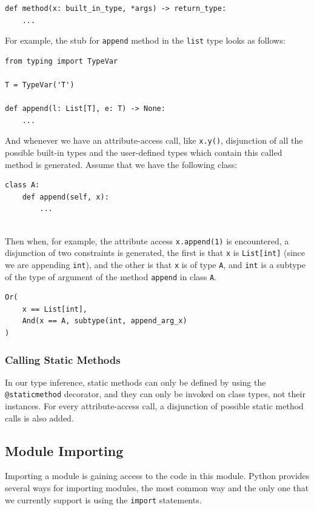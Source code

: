 \begin{lstlisting}
def method(x: built_in_type, *args) -> return_type:
	...
\end{lstlisting}
For example, the stub for \lstinline|append| method in the \lstinline|list| type looks as follows:

\begin{lstlisting}
from typing import TypeVar

T = TypeVar('T')

def append(l: List[T], e: T) -> None:
	...
\end{lstlisting}

And whenever we have an attribute-access call, like \lstinline|x.y()|, disjunction of all the possible built-in types and the user-defined types which contain this called method is generated. Assume that we have the following class:

\begin{lstlisting}
class A:
	def append(self, x):
		...
		
\end{lstlisting}

Then when, for example, the attribute access \lstinline|x.append(1)| is encountered, a disjunction of two constraints is generated, the first is that \lstinline|x| is \lstinline|List[int]| (since we are appending \lstinline|int|), and the other is that \lstinline|x| is of type \lstinline|A|, and \lstinline|int| is a subtype of the type of argument of the method \lstinline|append| in class \lstinline|A|.

\begin{lstlisting}
Or(
	x == List[int],
	And(x == A, subtype(int, append_arg_x)
)
\end{lstlisting}

\subsubsection{Calling Static Methods}
In our type inference, static methods can only be defined by using the \lstinline|@staticmethod| decorator, and they can only be invoked on class types, not their instances. For every attribute-access call, a disjunction of possible static method calls is also added.

\subsection{Module Importing}
Importing a module is gaining access to the code in this module. Python provides several ways for importing modules, the most common way and the only one that we currently support is using the \lstinline|import| statements.

